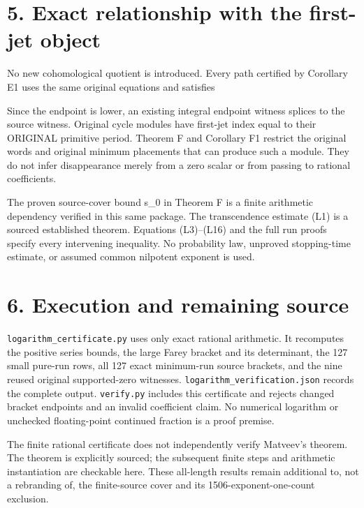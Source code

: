 \section{5. Exact relationship with the first-jet object}

No new cohomological quotient is introduced. Every path certified by
Corollary E1 uses the same original equations and satisfies


Since the endpoint is lower, an existing integral endpoint witness
splices to the source witness. Original cycle modules have first-jet
index equal to their ORIGINAL primitive period. Theorem F and Corollary
F1 restrict the original words and original minimum placements that can
produce such a module. They do not infer disappearance merely from a
zero scalar or from passing to rational coefficients.

The proven source-cover bound s\_0 in Theorem F is a finite arithmetic
dependency verified in this same package. The transcendence estimate
(L1) is a sourced established theorem. Equations (L3)--(L16) and the
full run proofs specify every intervening inequality. No probability
law, unproved stopping-time estimate, or assumed common nilpotent
exponent is used.

\section{6. Execution and remaining source}

\nolinkurl{logarithm_certificate.py} uses only exact rational
arithmetic. It recomputes the positive series bounds, the large Farey
bracket and its determinant, the 127 small pure-run rows, all 127 exact
minimum-run source brackets, and the nine reused original supported-zero
witnesses. \nolinkurl{logarithm_verification.json} records the complete
output. \nolinkurl{verify.py} includes this certificate and rejects
changed bracket endpoints and an invalid coefficient claim. No numerical
logarithm or unchecked floating-point continued fraction is a proof
premise.

The finite rational certificate does not independently verify Matveev's
theorem. The theorem is explicitly sourced; the subsequent finite steps
and arithmetic instantiation are checkable here. These all-length
results remain additional to, not a rebranding of, the finite-source
cover and its 1506-exponent-one-count exclusion.

